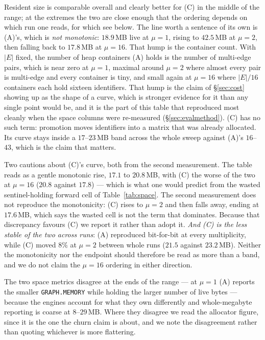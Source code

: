 \documentclass[11pt,a4paper]{article}
\theoremstyle{plain}
\theoremstyle{definition}
\theoremstyle{remark}
\begin{document}
Resident size is comparable overall and clearly better for (C) in the middle of
the range; at the extremes the two are close enough that the ordering depends on
which run one reads, for which see below. The line worth a sentence of its own is (A)'s,
which is \emph{not monotonic}: $18.9$\,MB live at $\mu = 1$, rising to
$42.5$\,MB at $\mu = 2$, then falling back to $17.8$\,MB at $\mu = 16$. That
hump is the container count. With $|E|$ fixed, the number of heap containers
(A) holds is the number of multi-edge pairs, which is near zero at $\mu = 1$,
maximal around $\mu = 2$ where almost every pair is multi-edge and every
container is tiny, and small again at $\mu = 16$ where $|E|/16$ containers each
hold sixteen identifiers. That hump is the claim of \S\ref{sec:cost} showing up
as the shape of a curve, which is stronger evidence for it than any single point
would be, and it is the part of this table that reproduced most cleanly when the
space columns were re-measured (\S\ref{sec:evalmethod}). (C) has no such term:
promotion moves identifiers into a matrix that was already allocated. Its curve
stays inside a $17$--$23$\,MB band across the whole sweep against (A)'s
$16$--$43$, which is the claim that matters.

Two cautions about (C)'s curve, both from the second measurement. The table
reads as a gentle monotonic rise, $17.1$ to $20.8$\,MB, with (C) the worse of
the two at $\mu = 16$ ($20.8$ against $17.8$) --- which is what one would
predict from the wasted sentinel-holding forward cell of
Table~\ref{tab:space}. The second measurement does not reproduce the
monotonicity: (C) rises to $\mu = 2$ and then falls away, ending at
$17.6$\,MB, which says the wasted cell is not the term that dominates. Because
that discrepancy favours (C) we report it rather than adopt it. \emph{And (C)
is the less stable of the two across runs}: (A) reproduced bit-for-bit at every multiplicity, while (C) moved
$8\%$ at $\mu = 2$ between whole runs ($21.5$ against $23.2$\,MB). Neither the
monotonicity nor the endpoint should therefore be read as more than a band, and
we do not claim the $\mu = 16$ ordering in either direction.

The two space metrics disagree at the ends of the range --- at $\mu = 1$ (A)
reports the smaller \texttt{GRAPH.MEMORY} while holding the larger number of
live bytes --- because the engines account for what they own differently and
whole-megabyte reporting is coarse at $8$--$29$\,MB. Where they disagree we
read the allocator figure, since it is the one the churn claim is about, and we
note the disagreement rather than quoting whichever is more flattering.
\end{document}

